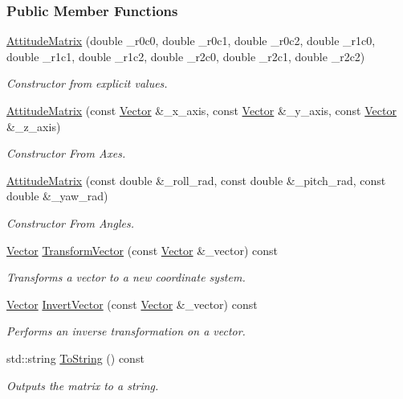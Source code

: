 \subsubsection*{Public Member Functions}
\begin{DoxyCompactItemize}
\item 
\hyperlink{classosse_1_1collaborate_1_1_attitude_matrix_a0b360f9d96986756913036ff54f376d1}{Attitude\+Matrix} (double \+\_\+r0c0, double \+\_\+r0c1, double \+\_\+r0c2, double \+\_\+r1c0, double \+\_\+r1c1, double \+\_\+r1c2, double \+\_\+r2c0, double \+\_\+r2c1, double \+\_\+r2c2)
\begin{DoxyCompactList}\small\item\em Constructor from explicit values. \end{DoxyCompactList}\item 
\hyperlink{classosse_1_1collaborate_1_1_attitude_matrix_a6a1587b50904e9ee723c512869cfad36}{Attitude\+Matrix} (const \hyperlink{classosse_1_1collaborate_1_1_vector}{Vector} \&\+\_\+x\+\_\+axis, const \hyperlink{classosse_1_1collaborate_1_1_vector}{Vector} \&\+\_\+y\+\_\+axis, const \hyperlink{classosse_1_1collaborate_1_1_vector}{Vector} \&\+\_\+z\+\_\+axis)
\begin{DoxyCompactList}\small\item\em Constructor From Axes. \end{DoxyCompactList}\item 
\hyperlink{classosse_1_1collaborate_1_1_attitude_matrix_a5edb54306470ebb06558a0910622a75f}{Attitude\+Matrix} (const double \&\+\_\+roll\+\_\+rad, const double \&\+\_\+pitch\+\_\+rad, const double \&\+\_\+yaw\+\_\+rad)
\begin{DoxyCompactList}\small\item\em Constructor From Angles. \end{DoxyCompactList}\item 
\hyperlink{classosse_1_1collaborate_1_1_vector}{Vector} \hyperlink{classosse_1_1collaborate_1_1_attitude_matrix_afc7bdadbaea2ac55fbec218ea17ce6a3}{Transform\+Vector} (const \hyperlink{classosse_1_1collaborate_1_1_vector}{Vector} \&\+\_\+vector) const
\begin{DoxyCompactList}\small\item\em Transforms a vector to a new coordinate system. \end{DoxyCompactList}\item 
\hyperlink{classosse_1_1collaborate_1_1_vector}{Vector} \hyperlink{classosse_1_1collaborate_1_1_attitude_matrix_a55ac57cf36bee476974db1cfe7bcd7e1}{Invert\+Vector} (const \hyperlink{classosse_1_1collaborate_1_1_vector}{Vector} \&\+\_\+vector) const
\begin{DoxyCompactList}\small\item\em Performs an inverse transformation on a vector. \end{DoxyCompactList}\item 
std\+::string \hyperlink{classosse_1_1collaborate_1_1_attitude_matrix_af8945f566ab44170c579b16662004bd2}{To\+String} () const
\begin{DoxyCompactList}\small\item\em Outputs the matrix to a string. \end{DoxyCompactList}\end{DoxyCompactItemize}
